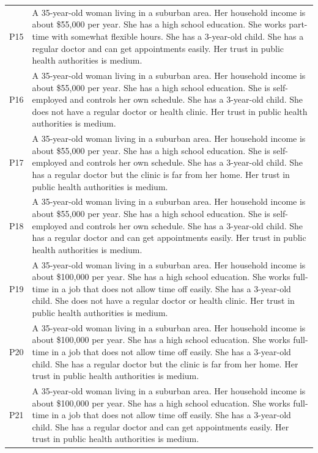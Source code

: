 \documentclass[11pt]{article}
\begin{document}
\begin{longtable}{p{1.2cm}p{12cm}}
P15 & A 35-year-old woman living in a suburban area. Her household income is about \$55,000 per year. She has a high school education. She works part-time with somewhat flexible hours. She has a 3-year-old child. She has a regular doctor and can get appointments easily. Her trust in public health authorities is medium. \\
P16 & A 35-year-old woman living in a suburban area. Her household income is about \$55,000 per year. She has a high school education. She is self-employed and controls her own schedule. She has a 3-year-old child. She does not have a regular doctor or health clinic. Her trust in public health authorities is medium. \\
P17 & A 35-year-old woman living in a suburban area. Her household income is about \$55,000 per year. She has a high school education. She is self-employed and controls her own schedule. She has a 3-year-old child. She has a regular doctor but the clinic is far from her home. Her trust in public health authorities is medium. \\
P18 & A 35-year-old woman living in a suburban area. Her household income is about \$55,000 per year. She has a high school education. She is self-employed and controls her own schedule. She has a 3-year-old child. She has a regular doctor and can get appointments easily. Her trust in public health authorities is medium. \\
P19 & A 35-year-old woman living in a suburban area. Her household income is about \$100,000 per year. She has a high school education. She works full-time in a job that does not allow time off easily. She has a 3-year-old child. She does not have a regular doctor or health clinic. Her trust in public health authorities is medium. \\
P20 & A 35-year-old woman living in a suburban area. Her household income is about \$100,000 per year. She has a high school education. She works full-time in a job that does not allow time off easily. She has a 3-year-old child. She has a regular doctor but the clinic is far from her home. Her trust in public health authorities is medium. \\
P21 & A 35-year-old woman living in a suburban area. Her household income is about \$100,000 per year. She has a high school education. She works full-time in a job that does not allow time off easily. She has a 3-year-old child. She has a regular doctor and can get appointments easily. Her trust in public health authorities is medium. \\

\end{longtable}
\end{document}

